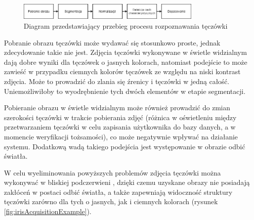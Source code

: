 \documentclass[10pt,polish,a4paper,oneside]{ppfcmthesis}
\begin{document}
\begin{figure}[ht]
  \centering
  \includegraphics[width=0.8\textwidth]{images/intro/processDiagram.png}
  \caption{Diagram przedstawiający przebieg procesu rozpoznawania tęczówki}
  \label{fig:processDiagram}
\end{figure}

Pobranie obrazu tęczówki może wydawa\'c się stosunkowo proste, jednak zdecydowanie takie nie
jest. Zdjęcia tęczówki wykonywane w świetle widzialnym dają dobre wyniki dla tęczówek o jasnych
kolorach, natomiast podejście to może zawieś\'c w przypadku ciemnych kolorów tęczówek ze względu
na niski kontrast zdjęcia. Może to prowadzi\'c do zlania się \'zrenicy i tęczówki w jedną całoś\'c.
Uniemożliwiłoby to wyodrębnienie tych dwóch elementów w etapie segmentacji.

Pobieranie obrazu w świetle widzialnym może również prowadzi\'c do zmian szerokości tęczówki w trakcie
pobierania zdję\'c (różnica w oświetleniu między przetwarzaniem tęczówki w celu zapisania użytkownika
do bazy danych, a w momencie weryfikacji tożsamości), co może negatywnie wpływa\'c na działanie
systemu. Dodatkową wadą takiego podejścia jest występowanie w obrazie odbi\'c światła.

W celu wyeliminowania powyższych problemów zdjęcia tęczówki można wykonywa\'c w bliskiej podczerwieni \cite{IrisRecognitionPresentation},
dzięki czemu uzyskane obrazy nie posiadają zakłóceń w postaci odbi\'c światła, a także
zapewniają widocznoś\'c struktury tęczówki zarówno dla tych o jasnych, jak i ciemnych kolorach (rysunek \ref{fig:irisAcquisitionExample}).
\end{document}

